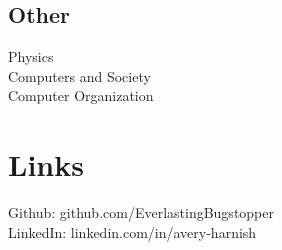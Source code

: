 \documentclass[letterpaper]{deedy-resume} %
\begin{document}
\begin{minipage}[t]{0.35\textwidth}
\sectionspace

\subsection{Other}
Physics\\
Computers and Society\\
Computer Organization


\sectionspace %



\section{Links} 

Github: github.com/EverlastingBugstopper \\
LinkedIn: linkedin.com/in/avery-harnish \\


\sectionspace %


\end{minipage} %
\hfill
%
%
\end{document}
